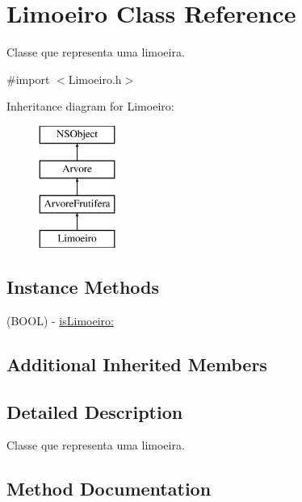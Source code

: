 \hypertarget{interface_limoeiro}{}\section{Limoeiro Class Reference}
\label{interface_limoeiro}


Classe que representa uma limoeira.  




{\ttfamily \#import $<$Limoeiro.\+h$>$}

Inheritance diagram for Limoeiro\+:\begin{figure}[H]
\begin{center}
\leavevmode
\includegraphics[height=4.000000cm]{interface_limoeiro}
\end{center}
\end{figure}
\subsection*{Instance Methods}
\begin{DoxyCompactItemize}
\item 
(B\+O\+O\+L) -\/ \hyperlink{interface_limoeiro_a589f9e161192981a840035885243f13a}{is\+Limoeiro\+:}
\end{DoxyCompactItemize}
\subsection*{Additional Inherited Members}


\subsection{Detailed Description}
Classe que representa uma limoeira. 

\subsection{Method Documentation}
\hypertarget{interface_limoeiro_a589f9e161192981a840035885243f13a}{}
